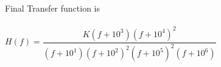 Final Transfer function is
\\ \\ 
$H(f) = \dfrac{K(f+10^{3})(f+10^{4})^{2}}{(f+10^{1})(f+10^{2})^{2}(f+10^{5})^{2}(f+10^{6})}$
\\ \\
\\ 
\\

